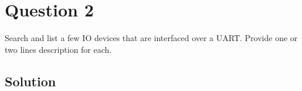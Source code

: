 \section*{Question 2}

Search and list a few IO devices that are interfaced over a UART.\@
Provide one or two lines description for each.

\subsection*{Solution}
